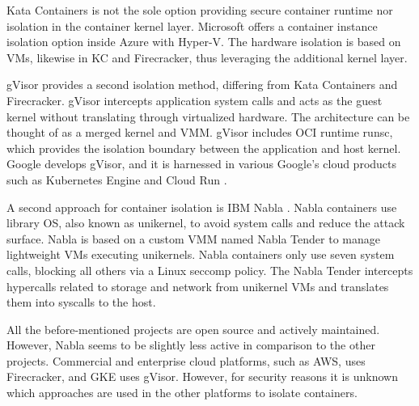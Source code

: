 Kata Containers is not the sole option providing secure container runtime nor isolation in the container kernel layer. Microsoft offers a container instance isolation option inside Azure with Hyper-V. The hardware isolation is based on VMs, likewise in KC and Firecracker, thus leveraging the additional kernel layer. \cite{Hyper-V}

gVisor provides a second isolation method, differing from Kata Containers and Firecracker. gVisor intercepts application system calls and acts as the guest kernel without translating through virtualized hardware. The architecture can be thought of as a merged kernel and VMM. gVisor includes OCI runtime runsc, which provides the isolation boundary between the application and host kernel. Google develops gVisor, and it is harnessed in various Google's cloud products such as Kubernetes Engine \cite{GKE} and Cloud Run \cite{CloudRun}. \cite{Debab2021}\cite{gVisor}

A second approach for container isolation is IBM Nabla \cite{Nabla}. Nabla containers use library OS, also known as unikernel, to avoid system calls and reduce the attack surface. Nabla is based on a custom VMM named Nabla Tender to manage lightweight VMs executing unikernels. Nabla containers only use seven system calls, blocking all others via a Linux seccomp policy. The Nabla Tender intercepts hypercalls related to storage and network from unikernel VMs and translates them into syscalls to the host. \cite{Debab2021}

All the before-mentioned projects are open source and actively maintained. However, Nabla seems to be slightly less active in comparison to the other projects. Commercial and enterprise cloud platforms, such as AWS, uses Firecracker, and GKE uses gVisor. However, for security reasons it is unknown which approaches are used in the other platforms to isolate containers.








